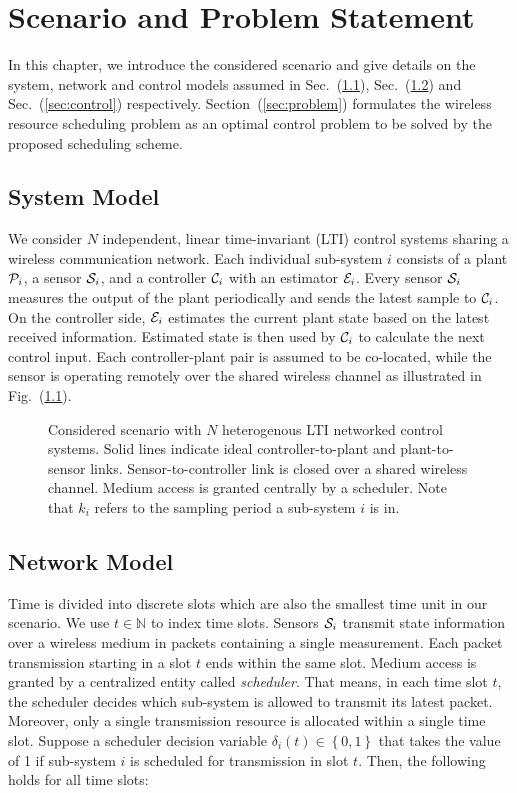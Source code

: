 \chapter{Scenario and Problem Statement}

In this chapter, we introduce the considered scenario and give details on the
system, network and control models assumed in Sec.~(\ref{sec:system}),
Sec.~(\ref{sec:network}) and Sec.~(\ref{sec:control}) respectively.
Section~(\ref{sec:problem}) formulates the wireless resource scheduling problem
as an optimal control problem to be solved by the proposed scheduling scheme.

\section{System Model} \label{sec:system}
We consider $N$ independent, linear time-invariant (LTI) control systems sharing
a wireless communication network. Each individual sub-system $i$ consists of a
plant $\mathcal{P}_i$, a sensor $\mathcal{S}_i$, and a controller $\mathcal{C}_i$ with an
estimator $\mathcal{E}_i$. Every sensor $\mathcal{S}_i$ measures the output of the plant
periodically and sends the latest sample to $\mathcal{C}_i$. On the controller
side, $\mathcal{E}_i$ estimates the current plant state based on the latest
received information. Estimated state is then used by $\mathcal{C}_i$ to calculate
the next control input. Each controller-plant pair is assumed to be co-located,
while the sensor is operating remotely over the shared wireless channel as
illustrated in Fig.~(\ref{fig:scenario}).

\begin{figure}[htb]
  \centering
  \resizebox*{.8\columnwidth}{!}{} \caption[Scheme of
  $N$ sub-systems sharing a wireless communication medium]{Considered scenario
  with $N$ heterogenous LTI networked control systems. Solid lines indicate
  ideal controller-to-plant and plant-to-sensor links. Sensor-to-controller link
  is closed over a shared wireless channel. Medium access is granted centrally
  by a scheduler. Note that $k_i$ refers to the sampling period a sub-system $i$
  is in.}
  \label{fig:scenario}
\end{figure}

\section{Network Model} \label{sec:network}
Time is divided into discrete slots which are also the smallest time unit in our
scenario. We use $t \in \mathbb{N}$ to index time slots. Sensors $\mathcal{S}_i$
transmit state information over a wireless medium in packets containing a single
measurement. Each packet transmission starting in a slot $t$ ends within the
same slot. Medium access is granted by a centralized entity called
\textit{scheduler}. That means, in each time slot $t$, the scheduler decides
which sub-system is allowed to transmit its latest packet. Moreover, only a
single transmission resource is allocated within a single time slot. Suppose a
scheduler decision variable $\delta_i(t) \in \left\{0,1\right\}$ that takes the
value of 1 if sub-system $i$ is scheduled for transmission in slot $t$.
Then, the following holds for all time slots:

